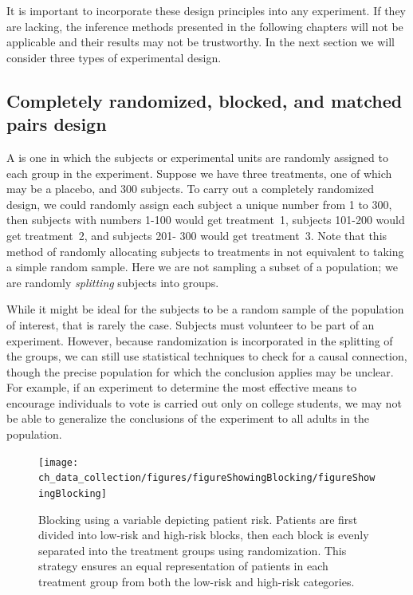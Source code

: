 It is important to incorporate these design principles into any experiment. If they are lacking, the inference methods presented in the following chapters will not be applicable and their results may not be trustworthy. In the next section we will consider three types of experimental design.


\subsection{Completely randomized, blocked, and matched pairs design}
\label{CompletelyRandomizedBlockedAndMatchedPairsDesign}


A  is one in which the subjects or experimental units are randomly assigned to each group in the experiment. Suppose we have three treatments, one of which may be a placebo, and 300 subjects. To carry out a completely randomized design, we could randomly assign each subject a unique number from 1 to 300, then subjects with numbers 1-100 would get treatment~1, subjects 101-200 would get treatment~2, and subjects 201- 300 would get treatment~3. Note that this method of randomly allocating subjects to treatments in not equivalent to taking a simple random sample. Here we are not sampling a subset of a population; we are randomly \emph{splitting} subjects into groups.


While it might be ideal for the subjects to be a random sample of the population of interest, that is rarely the case. Subjects must volunteer to be part of an experiment. However, because randomization is incorporated in the splitting of the groups, we can still use statistical techniques to check for a causal connection, though the precise population for which the conclusion applies may be unclear. For example, if an experiment to determine the most effective means to encourage individuals to vote is carried out only on college students, we may not be able to generalize the conclusions of the experiment to all adults in the population.

\begin{figure}
\centering
\texttt{[image: ch\_data\_collection/figures/figureShowingBlocking/figureShowingBlocking]}
\caption{Blocking using a variable depicting patient risk. Patients are first divided into low-risk and high-risk blocks, then each block is evenly separated into the treatment groups using randomization. This strategy ensures an equal representation of patients in each treatment group from both the low-risk and high-risk categories.}
\label{figureShowingBlocking}
\end{figure}

